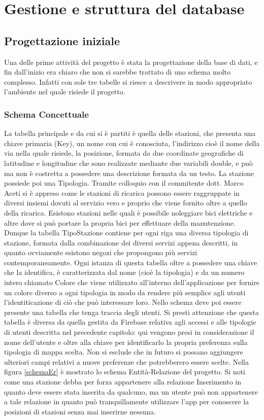 \section{Gestione e struttura del database}

\subsection{Progettazione iniziale}
Una delle prime attività del progetto è stata la progettazione della base di
dati, e fin dall'inizio era chiaro che non si sarebbe trattato di uno schema
molto complesso. Infatti con sole tre tabelle si riesce a descrivere in modo
appropriato l'ambiente nel quale risiede il progetto.
\subsubsection{Schema Concettuale}
 La tabella principale e da cui si è partiti è
quella delle stazioni, che presenta una chiave primaria (Key), un nome con
cui è conosciuta, l'indirizzo cioè il nome della via nella quale risiede, la
posizione, formata da due coordinate geografiche di latitudine e longitudine che
sono realizzate mediante due variabili double, e
può ma non è costretta a possedere una descrizione formata da un testo. La
stazione possiede poi una Tipologia. Tramite colloquio con il commitente dott.
Marco  Aceti si è appreso come le stazioni di ricarica possono essere
raggruppate
in diversi insiemi dovuti al servizio vero e proprio che viene fornito oltre a
quello della ricarica. Esistono stazioni nelle quali è possibile noleggiare bici
elettriche e altre dove si può portare la propria bici per effettuare della manutenzione.
Dunque la tabella TipoStazione contiene per ogni riga una diversa tipologia di
stazione, formata dalla combinazione dei diversi servizi appena descritti, in
quanto ovviamente esistono negozi che propongono più servizi contemporaneamente.
Ogni istanza di questa tabella oltre a possedere una chiave che la identifica,
è caratterizzata dal nome (cioè la tipologia) e da un numero intero chiamato
Colore che viene utilizzato all'interno dell'applicazione per fornire un colore
diverso a ogni tipologia in modo da rendere più semplice agli utenti
l'identiticazione di ciò che può interessare loro. Nello schema deve poi essere
presente una tabella che tenga traccia degli utenti. Si presti attenzione che
questa tabella è diversa da quella gestita da Firebase relativa agli accessi e
alle tipologie di utenti descritta nel precedente capitolo: qui vengono presi in
considerazione il nome dell'utente e oltre alla chiave per identificarlo la
propria preferenza sulla tipologia di mappa scelta. Non si esclude che in futuro
si possano aggiungere ulteriori campi relativi a nuove preferenze che
potrebberero essere scelte. Nella figura \ref{schemaEr} è mostrato lo schema Entità-Relazione
del progetto. Si noti come una stazione debba per forza appartenere alla
relazione Inserimento in quanto deve essere stata inserita da qualcuno, ma un
utente può non appartenere a tale relazione in quanto può tranquillamente
utilizzare l'app per conoscere la posizioni di stazioni senza mai inserirne nessuna.

